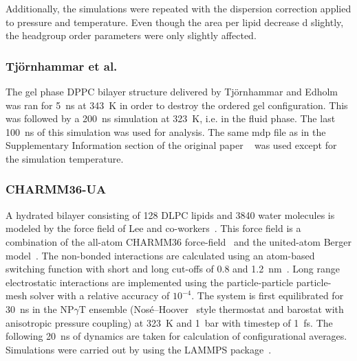 \documentclass[pre,aps,floatfix,authordate1-4,twocolumn]{revtex4-1}
\begin{document}
Additionally, the simulations were repeated with the dispersion correction applied to pressure and temperature. Even though the area per lipid decrease
d slightly, the headgroup order parameters were only slightly affected.

\subsubsection{Tj\"ornhammar et al.}

The gel phase DPPC bilayer structure delivered by Tj\"ornhammar  and Edholm~\cite{tjornhammar14} was ran for 5~ns at 343~K in order to destroy the 
ordered gel configuration. This was followed by a 200~ns simulation at 323~K, i.e. in the fluid phase. The last 100~ns of this simulation was used for analysis. 
The same mdp file as in the Supplementary Information section of the original paper ~\cite{tjornhammar14} was used except for the simulation temperature.

\subsubsection{CHARMM36-UA}
A hydrated bilayer consisting of 128 DLPC lipids and 3840 water molecules is modeled by the force field of Lee and co-workers~\cite{lee14}.
This force field is a combination of the all-atom CHARMM36 force-field~\cite{klauda10} and the united-atom Berger model~\cite{berger97}. 
The non-bonded interactions are calculated using an atom-based switching function with short and long cut-offs of 0.8 and 1.2~nm~\cite{lee14}. 
Long range electrostatic interactions are implemented using the particle-particle particle-mesh solver with a relative accuracy of $10^{-4}$. The system 
is first equilibrated for 30~ns in the NP$\gamma$T ensemble (Nos\'{e}--Hoover~\cite{nose84,hoover85} style thermostat and barostat with anisotropic pressure coupling) 
at 323~K and 1~bar with timestep of 1~fs. The following 20~ns of dynamics are taken for calculation of configurational averages. 
Simulations were carried out by using the LAMMPS package~\cite{plimpton95}. %

\end{document}
